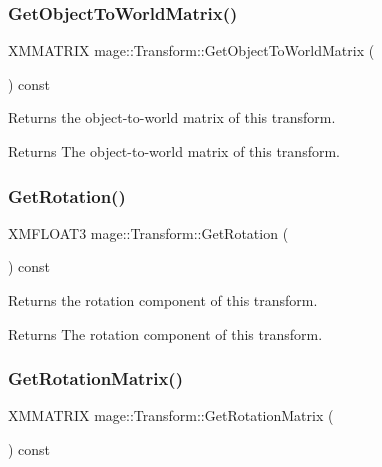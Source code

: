 \subsubsection{\texorpdfstring{Get\+Object\+To\+World\+Matrix()}{GetObjectToWorldMatrix()}}
{\footnotesize\ttfamily X\+M\+M\+A\+T\+R\+IX mage\+::\+Transform\+::\+Get\+Object\+To\+World\+Matrix (\begin{DoxyParamCaption}{ }\end{DoxyParamCaption}) const}

Returns the object-\/to-\/world matrix of this transform.

\begin{DoxyReturn}{Returns}
The object-\/to-\/world matrix of this transform. 
\end{DoxyReturn}
\hypertarget{structmage_1_1_transform_a30a0464b1bd2fb37d6b5cc2155323a14}{}\label{structmage_1_1_transform_a30a0464b1bd2fb37d6b5cc2155323a14} 
\subsubsection{\texorpdfstring{Get\+Rotation()}{GetRotation()}}
{\footnotesize\ttfamily X\+M\+F\+L\+O\+A\+T3 mage\+::\+Transform\+::\+Get\+Rotation (\begin{DoxyParamCaption}{ }\end{DoxyParamCaption}) const}

Returns the rotation component of this transform.

\begin{DoxyReturn}{Returns}
The rotation component of this transform. 
\end{DoxyReturn}
\hypertarget{structmage_1_1_transform_a27ca7a5c40ea16c9a885a410b2a1f416}{}\label{structmage_1_1_transform_a27ca7a5c40ea16c9a885a410b2a1f416} 
\subsubsection{\texorpdfstring{Get\+Rotation\+Matrix()}{GetRotationMatrix()}}
{\footnotesize\ttfamily X\+M\+M\+A\+T\+R\+IX mage\+::\+Transform\+::\+Get\+Rotation\+Matrix (\begin{DoxyParamCaption}{ }\end{DoxyParamCaption}) const}

